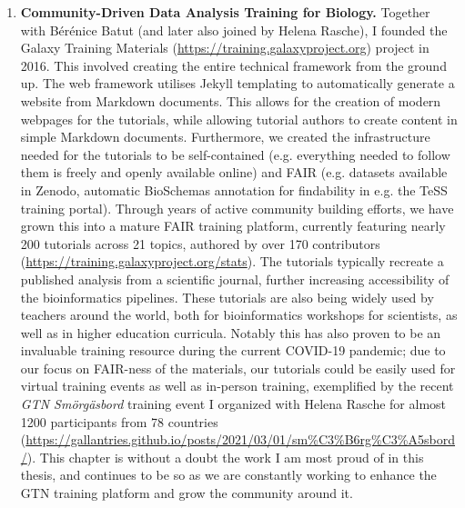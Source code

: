 \begin{enumerate}[label=\ref{chapter:training}.\arabic*]
\itemsep-0.5em
\setcounter{enumi}{-1}
\item \textbf{Community-Driven Data Analysis Training for Biology.} Together with Bérénice Batut (and later also joined by Helena Rasche), I founded the Galaxy Training Materials (\url{https://training.galaxyproject.org}) project in 2016. This involved creating the entire technical framework from the ground up. The web framework utilises Jekyll templating to automatically generate a website from Markdown documents. This allows for the creation of modern webpages for the tutorials, while allowing tutorial authors to create content in simple Markdown documents. Furthermore, we created the infrastructure needed for the tutorials to be self-contained (e.g. everything needed to follow them is freely and openly available online) and FAIR (e.g. datasets available in Zenodo, automatic BioSchemas annotation for findability in e.g. the TeSS training portal). Through years of active community building efforts, we have grown this into a mature FAIR training platform, currently featuring nearly 200 tutorials across 21 topics, authored by over 170 contributors (\url{https://training.galaxyproject.org/stats}). The tutorials typically recreate a published analysis from a scientific journal, further increasing accessibility of the bioinformatics pipelines. These tutorials are also being widely used by teachers around the world, both for bioinformatics workshops for scientists, as well as in higher education curricula. Notably this has also proven to be an invaluable training resource during the current COVID-19 pandemic; due to our focus on FAIR-ness of the materials, our tutorials could be easily used for virtual training events as well as in-person training, exemplified by the recent \emph{GTN Smörgäsbord} training event I organized with Helena Rasche for almost 1200 participants from 78 countries (\url{https://gallantries.github.io/posts/2021/03/01/sm\%C3\%B6rg\%C3\%A5sbord/}). This chapter is without a doubt the work I am most proud of in this thesis, and continues to be so as we are constantly working to enhance the GTN training platform and grow the community around it.
\end{enumerate}
